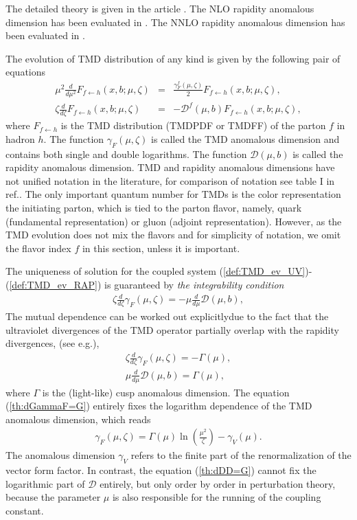 \documentclass[prd,nofootinbib,eqsecnum,final]{revtex4}
\newcommand{\ot}{\leftarrow}
\renewcommand{\(}{\left(}
\renewcommand{\)}{\right)}
\renewcommand{\[}{\left[}
\renewcommand{\]}{\right]}
\begin{document}
The detailed theory is given in the article \cite{Scimemi:2018xaf}. The NLO rapidity anomalous dimension has been evaluated in \cite{Echevarria:2015byo}. The NNLO rapidity anomalous dimension has been evaluated in \cite{Vladimirov:2016dll,Vladimirov:2017ksc}.

The evolution of TMD distribution of any kind is given by the following pair of equations
\begin{eqnarray}\label{def:TMD_ev_UV}
\mu^2 \frac{d}{d\mu^2} F_{f\ot h}(x,b;\mu,\zeta)&=&\frac{\gamma^f_F(\mu,\zeta)}{2}F_{f\ot h}(x,b;\mu,\zeta),
\\\label{def:TMD_ev_RAP}
\zeta\frac{d}{d\zeta}F_{f \ot h}(x,b;\mu,\zeta)&=& -\mathcal{D}^f(\mu,b)F_{f\ot h}(x,b;\mu,\zeta),
\end{eqnarray}
where $F_{f\ot h}$ is the TMD distribution (TMDPDF or TMDFF) of the parton $f$ in hadron $h$. The function $\gamma_F(\mu,\zeta)$ is called the TMD anomalous dimension and contains both single and double logarithms. The function $\mathcal{D}(\mu,b)$ is called the rapidity anomalous dimension. TMD and rapidity anomalous dimensions have not unified notation in the literature, for comparison of notation see table I in ref.\cite{Scimemi:2018xaf}. The only important quantum number for TMDs is the color representation the initiating parton, which is tied to the parton flavor, namely, quark (fundamental representation) or gluon (adjoint representation). However,  as the TMD evolution does not mix the flavors and  for simplicity of  notation, we omit the flavor index $f$ in this section, unless it is important. 

The uniqueness of solution for the coupled system (\ref{def:TMD_ev_UV})-(\ref{def:TMD_ev_RAP}) is guaranteed by \textit{the integrability condition}
\begin{eqnarray}\label{th:consitency}
\zeta \frac{d}{d\zeta}\gamma_F(\mu,\zeta)=-\mu \frac{d}{d\mu}\mathcal{D}(\mu,b),
\end{eqnarray} 
The mutual dependence can be worked out  explicitlydue to the fact that the ultraviolet divergences of the TMD operator partially overlap with the rapidity divergences, (see e.g.\cite{Collins:2011zzd,Vladimirov:2017ksc}), 
\begin{eqnarray}\label{th:dGammaF=G}
\zeta \frac{d}{d\zeta}\gamma_F(\mu,\zeta)=-\Gamma(\mu),
\\\label{th:dDD=G}
\mu \frac{d}{d\mu}\mathcal{D}(\mu,b)=\Gamma(\mu),
\end{eqnarray}
where $\Gamma$ is the (light-like) cusp anomalous dimension. The equation (\ref{th:dGammaF=G}) entirely fixes the logarithm dependence of the TMD anomalous dimension, which reads
\begin{eqnarray}\label{th:gammaV}
\gamma_F(\mu,\zeta)=\Gamma(\mu) \ln\(\frac{\mu^2}{\zeta}\)-\gamma_V(\mu).
\end{eqnarray}
The anomalous dimension $\gamma_V$ refers to the finite part of the renormalization of the vector form factor. In contrast, the equation (\ref{th:dDD=G}) cannot fix the logarithmic part of $\mathcal{D}$ entirely, but only order by order in  perturbation theory, because the parameter $\mu$ is also responsible for the running of the coupling constant.
\end{document}
